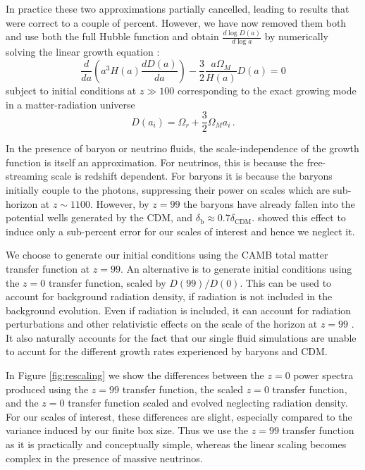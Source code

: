 \documentclass[useAMS, usenatbib]{mnras}
\begin{document}
In practice these two approximations partially cancelled, leading
to results that were correct to a couple of percent. However, we
have now removed them both and use both the full Hubble function
and obtain $\frac{d \log D(a)}{d \log a}$ by numerically solving
the linear growth equation \citep{Peebles:1993}:
\begin{equation}
\frac{d}{da}\left(a^3 H(a) \frac{d D(a)}{da}\right) - \frac{3}{2} \frac{a \Omega_M}{H(a)} D(a) = 0
\end{equation}
subject to initial conditions at $z \gg 100$ corresponding
to the exact growing mode in a matter-radiation universe \citep{Groth:1975}
\begin{equation}
  D(a_i) = \Omega_r + \frac{3}{2} \Omega_M a_i\,.
\end{equation}

In the presence of baryon or neutrino fluids, the scale-independence
of the growth function is itself an approximation. For neutrinos, this
is because the free-streaming scale is redshift dependent. For baryons
it is because the baryons initially couple to the photons, suppressing
their power on scales which are sub-horizon at $z \sim 1100$. However,
by $z=99$ the baryons have already fallen into
the potential wells generated by the CDM,
and $\delta_\mathrm{b} \approx 0.7 \delta_\mathrm{CDM}$.
\cite{Zennaro_2017} showed this effect to induce only
a sub-percent error for our scales of interest and hence we neglect it.

We choose to generate our initial conditions using the CAMB total matter transfer
function at $z=99$. An alternative is to generate initial conditions
using the $z=0$ transfer function, scaled by $D(99)/D(0)$. This can
be used to account for background radiation density, if radiation is not included
in the background evolution. Even if radiation is included, it can account
for radiation perturbations and other relativistic effects on the scale
of the horizon at $z=99$ \citep{Zennaro_2017}. It also naturally accounts
for the fact that our single fluid simulations are unable to accunt for
the different growth rates experienced by baryons and CDM.

In Figure \ref{fig:rescaling} we show the differences between the $z=0$
power spectra produced using the $z=99$ transfer function, the
scaled $z=0$ transfer function, and the $z=0$ transfer function
scaled and evolved neglecting radiation density.
For our scales of interest, these differences are slight,
especially compared to the variance induced by our finite box size.
Thus we use the $z=99$ transfer function as it is practically and conceptually simple,
whereas the linear scaling becomes complex in the presence of massive neutrinos.
\end{document}
